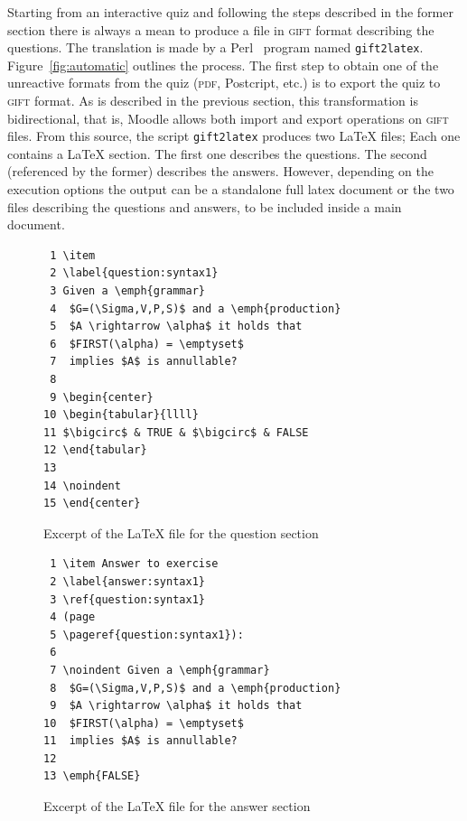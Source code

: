 \documentclass{pracjourn}[2006/02/20]
\begin{document}
Starting from an interactive quiz and following the steps described in the 
former section there is always a mean to produce a file in \textsc{gift}
format describing the questions.
%
The translation is made by a Perl~\cite{Wal:91} program named \texttt{gift2\-latex}.  
%
Figure~\ref{fig:automatic} outlines the process.
%
The first step to obtain one of the unreactive formats from the quiz 
(\textsc{pdf}, Postcript, etc.) is to export the quiz to \textsc{gift} format.  
%
As is described in the previous section, this transformation is bidirectional, 
that is, Moodle allows both import and export operations on \textsc{gift} files.
%
From this source, the script \texttt{gift2latex} produces two \LaTeX{} files; 
Each one contains a \LaTeX{} section. The
first one describes the questions.  The second (referenced by the former)
describes the answers. 
%
However, depending on the execution options the output can be a standalone full latex 
document or the two files describing the questions and answers, 
to be included inside a main document. 

\begin{figure}[hbt]
\mbox{}\hrulefill
\vspace{-.6em}
\begin{footnotesize}
\begin{verbatim}
 1 \item
 2 \label{question:syntax1}
 3 Given a \emph{grammar}
 4  $G=(\Sigma,V,P,S)$ and a \emph{production}
 5  $A \rightarrow \alpha$ it holds that 
 6  $FIRST(\alpha) = \emptyset$ 
 7  implies $A$ is annullable?
 8 
 9 \begin{center}
10 \begin{tabular}{llll}
11 $\bigcirc$ & TRUE & $\bigcirc$ & FALSE
12 \end{tabular}
13 
14 \noindent 
15 \end{center} \end{verbatim}
\end{footnotesize}
\vspace{-1.5em}
\hrulefill
\caption{Excerpt of the \LaTeX{} file for the question section}
\label{fig:questions}
\end{figure}

\begin{figure}[hbt]
\mbox{}\hrulefill
\vspace{-.6em}
\begin{footnotesize}
\begin{verbatim}
 1 \item Answer to exercise
 2 \label{answer:syntax1}
 3 \ref{question:syntax1}
 4 (page
 5 \pageref{question:syntax1}):
 6 
 7 \noindent Given a \emph{grammar}
 8  $G=(\Sigma,V,P,S)$ and a \emph{production}
 9  $A \rightarrow \alpha$ it holds that
10  $FIRST(\alpha) = \emptyset$ 
11  implies $A$ is annullable?
12 
13 \emph{FALSE}
\end{verbatim}
\end{footnotesize}
\vspace{-1.5em}
\hrulefill
\caption{Excerpt of the \LaTeX{} file for the answer section}
\label{fig:answers}
\end{figure}
\end{document}
